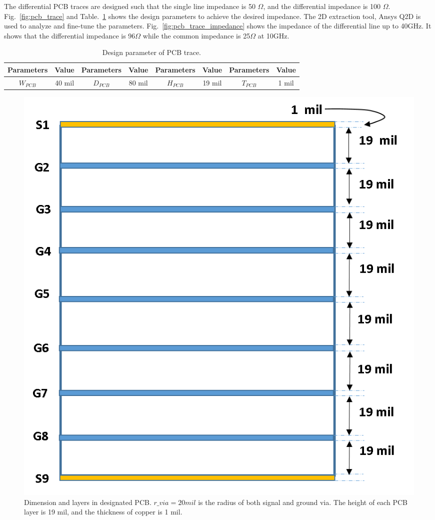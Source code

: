 \documentclass{book}  %
\renewcommand{\subsection}[1]{\psubsection{#1}}
\begin{document}
\begin{paper}
\subsection{PCB Traces}
\label{subsec:pcb_traces}
The differential PCB traces are designed such that the single line impedance is 50 $\Omega$, and the differential impedance is 100 $\Omega$. Fig.~\ref{fig:pcb_trace} and Table.~\ref{table:pcb_trace} shows the design parameters to achieve the desired impedance. The 2D extraction tool, Ansys Q2D is used to analyze and fine-tune the parameters. Fig.~\ref{fig:pcb_trace_impedance} shows the impedance of the differential line up to 40GHz. It shows that the differential impedance is 96$\Omega$ while the common impedance is 25$\Omega$ at 10GHz. 

\begin{table}[htbp!]
	\renewcommand{\arraystretch}{1.3}	
	\begin{center}
		\begin{tabular}{| c | c | c | c | c | c | c | c |}
			\hline
			Parameters  & Value  & Parameters & Value  & Parameters & Value  & Parameters & Value \\ \hline
			$W_{PCB}$   & 40 mil & $D_{PCB}$  & 80 mil & $H_{PCB}$  & 19 mil & $T_{PCB}$  & 1 mil \\
			\hline
		\end{tabular}
	\end{center}
	\label{table:pcb_trace}
	\caption{Design parameter of PCB trace.}
	\vskip0.2in
\end{table}

\begin{figure}[htbp!]
	\centering
	\includegraphics[width=0.8\columnwidth]{./img/PCB/PCB_layer_dimension.png}
	\caption{Dimension and layers in designated PCB. $r\_via=20 mil$ is the radius of both signal and ground via. The height of each PCB layer is 19 mil, and the thickness of copper is 1 mil. }
	\label{fig:pcb_layers} %
\end{figure}


\end{paper}
\end{document}
